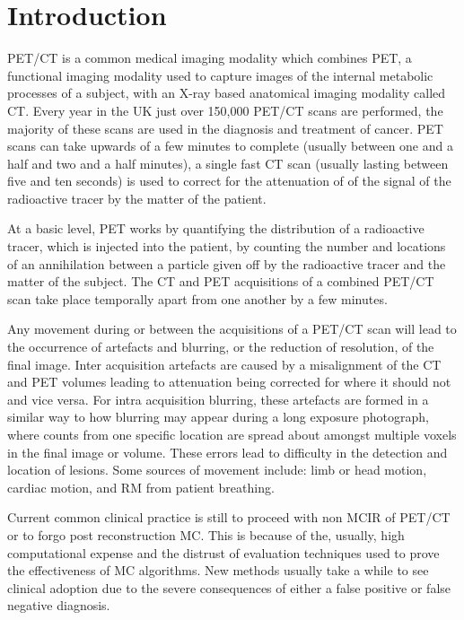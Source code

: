 \chapter{Introduction} \label{introduction}
    \blindtext
    
        \gls{PET}/\gls{CT} is a common medical imaging modality which combines \gls{PET}, a functional imaging modality used to capture images of the internal metabolic processes of a subject, with an X-ray based anatomical imaging modality called \gls{CT}. Every year in the UK just over 150,000 \gls{PET}/\gls{CT} scans are performed, the majority of these scans are used in the diagnosis and treatment of cancer. \gls{PET} scans can take upwards of a few minutes to complete (usually between one and a half and two and a half minutes), a single fast \gls{CT} scan (usually lasting between five and ten seconds) is used to correct for the attenuation of of the signal of the radioactive tracer by the matter of the patient.
        
        At a basic level, \gls{PET} works by quantifying the distribution of a radioactive tracer, which is injected into the patient, by counting the number and locations of an annihilation between a particle given off by the radioactive tracer and the matter of the subject. The \gls{CT} and \gls{PET} acquisitions of a combined \gls{PET}/\gls{CT} scan take place temporally apart from one another by a few minutes.
        
        Any movement during or between the acquisitions of a \gls{PET}/\gls{CT} scan will lead to the occurrence of artefacts and blurring, or the reduction of resolution, of the final image. Inter acquisition artefacts are caused by a misalignment of the \gls{CT} and \gls{PET} volumes leading to attenuation being corrected for where it should not and vice versa. For intra acquisition blurring, these artefacts are formed in a similar way to how blurring may appear during a long exposure photograph, where counts from one specific location are spread about amongst multiple voxels in the final image or volume. These errors lead to difficulty in the detection and location of lesions. Some sources of movement include: limb or head motion, cardiac motion, and \gls{RM} from patient breathing.
        
        Current common clinical practice is still to proceed with non \gls{MCIR} of \gls{PET}/\gls{CT} or to forgo post reconstruction \gls{MC}. This is because of the, usually, high computational expense and the distrust of evaluation techniques used to prove the effectiveness of \gls{MC} algorithms. New methods usually take a while to see clinical adoption due to the severe consequences of either a false positive or false negative diagnosis.
        
